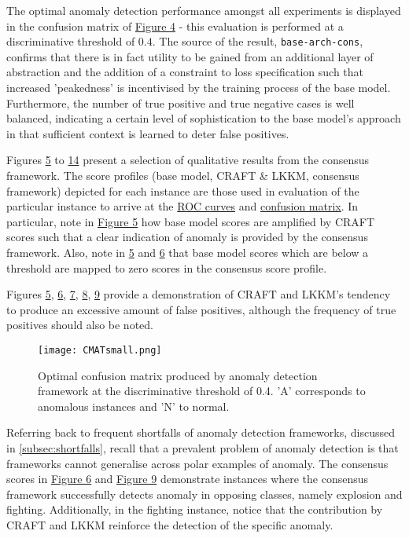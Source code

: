 \documentclass[sigplan,authorversion,nonacm, 9pt]{acmart}
\begin{document}
The optimal anomaly detection performance amongst all experiments is displayed in the confusion matrix of \hyperref[fig:CMAT]{Figure 4} - this evaluation is performed at a discriminative threshold of $0.4$. The source of the result, \texttt{base-arch-cons}, confirms that there is in fact utility to be gained from an additional layer of abstraction and the addition of a constraint to loss specification such that increased 'peakedness' is incentivised by the training process of the base model. Furthermore, the number of true positive and true negative cases is well balanced, indicating a certain level of sophistication to the base model's approach in that sufficient context is learned to deter false positives. 
\par
Figures \hyperref[fig:arson009]{5} to \hyperref[fig:failnormal041]{14} present a selection of qualitative results from the consensus framework. The score profiles (base model, CRAFT \& LKKM, consensus framework) depicted for each instance are those used in evaluation of the particular instance to arrive at the \hyperref[fig:ROC]{ROC curves} and \hyperref[fig:CMAT]{confusion matrix}.
In particular, note in \hyperref[fig:arson009]{Figure 5} how base model scores are amplified by CRAFT scores such that a clear indication of anomaly is provided by the consensus framework. Also, note in \hyperref[fig:arson009]{5} and \hyperref[fig:explosion008]{6} that base model scores which are below a threshold are mapped to zero scores in the consensus score profile. 
\par
Figures \hyperref[fig:arson009]{5}, \hyperref[fig:explosion008]{6}, \hyperref[fig:roadaccidents010]{7}, \hyperref[fig:vandalism007]{8}, \hyperref[fig:fighting033]{9} provide a demonstration of CRAFT and LKKM's tendency to produce an excessive amount of false positives, although the frequency of true positives should also be noted.
\begin{figure}[h!]
    \centering
    \texttt{[image: CMATsmall.png]}
    \caption{Optimal confusion matrix produced by anomaly detection framework at the discriminative threshold of 0.4. 'A' corresponds to anomalous instances and 'N' to normal.}
    \label{fig:CMAT}
\end{figure}
Referring back to frequent shortfalls of anomaly detection frameworks, discussed in \ref{subsec:shortfalls}, recall that a prevalent problem of anomaly detection is that frameworks cannot generalise across polar examples of anomaly. The consensus scores in \hyperref[fig:explosion008]{Figure 6} and \hyperref[fig:fighting033]{Figure 9} demonstrate instances where the consensus framework successfully detects anomaly in opposing classes, namely explosion and fighting. Additionally, in the fighting instance, notice that the contribution by CRAFT and LKKM reinforce the detection of the specific anomaly.
\end{document}
